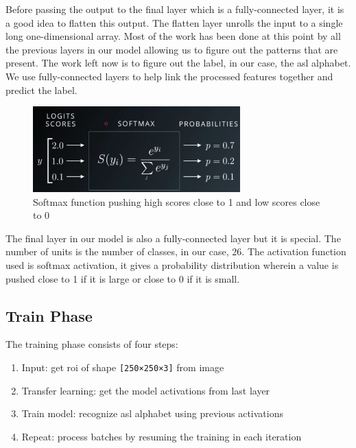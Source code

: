 \documentclass[twocolumn]{article}
\begin{document}
Before passing the output to the final layer which is a fully-connected layer, 
it is a good idea to flatten this output. The flatten layer unrolls the input 
to a single long one-dimensional array. Most of the work has been done at this 
point by all the previous layers in our model allowing us to figure out the 
patterns that are present. The work left now is to figure out the label, in 
our case, the \gls{asl} alphabet. We use fully-connected layers to help link 
the processed features together and predict the label.

\begin{figure}[h]
\centering
\includegraphics[width=8cm]{./figures/softmax function}
\caption{Softmax function pushing high scores close to 1 and low scores close to 0}
\end{figure}

The final layer in our model is also a fully-connected layer but it is 
special. The number of units is the number of classes, in our case, 26. The 
activation function used is softmax activation, it gives a probability 
distribution wherein a value is pushed close to 1 if it is large or close to 0 
if it is small.

\subsection{Train Phase}

The training phase consists of four steps:
\begin{enumerate}
  \item Input: get \gls{roi} of shape \texttt{[250×250×3]} from image
  \item Transfer learning: get the model activations from last layer
  \item Train model: recognize \gls{asl} alphabet using previous activations
  \item Repeat: process batches by resuming the training in each iteration
\end{enumerate}
\end{document}
